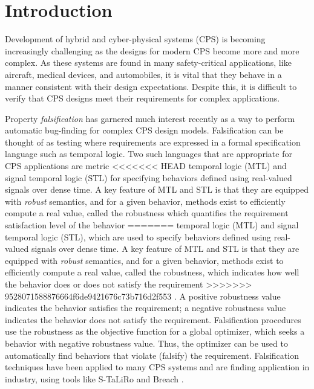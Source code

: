 \section{Introduction} \label{sec:introduction}

Development of hybrid and cyber-physical systems (CPS) is becoming
increasingly challenging as the designs for modern CPS become more and
more complex.  As these systems are found in many safety-critical
applications, like aircraft, medical devices, and automobiles, it is
vital that they behave in a manner consistent with their
design expectations. Despite this, it is difficult to verify that CPS
designs meet their requirements for complex applications.


Property \emph{falsification} has garnered much interest recently as a
way to perform automatic bug-finding for complex CPS design
models. Falsification can be thought of as testing where requirements are expressed 
in a formal specification language such as temporal logic.
Two such
languages that are appropriate for CPS applications are metric
<<<<<<< HEAD
temporal logic (MTL) and signal temporal logic (STL)
\cite{Koymans1990,MalerN04} for specifying behaviors defined
using real-valued signals over dense time. A key feature of MTL and
STL is that they are equipped with \emph{robust} semantics, and for a given behavior, methods exist to efficiently compute a
real value, called the robustness which quantifies the requirement satisfaction level of the behavior
=======
temporal logic (MTL) and signal temporal logic (STL),
which are used to specify behaviors defined
using real-valued signals over dense time. A key feature of MTL and
STL is that they are equipped with \emph{robust} semantics, and for a given behavior, methods exist to efficiently compute a
real value, called the robustness, which indicates how well the
behavior does or does not satisfy the requirement
>>>>>>> 9528071588876664f6de9421676c73b716d2f553
\cite{FainekosP06fates,DonzeM10}. A positive robustness value
indicates the behavior satisfies the requirement; a negative
robustness value indicates the behavior does not satisfy the
requirement. Falsification procedures use the robustness as the objective function
for a global optimizer, which seeks a
behavior with negative robustness value. Thus, the optimizer can
be used to automatically find behaviors that violate (falsify) the
requirement. Falsification techniques have been applied to many CPS
systems and are finding application in industry, using tools like
S-TaLiRo and Breach \cite{TaliroLFS11,BreachCAV10}. 

